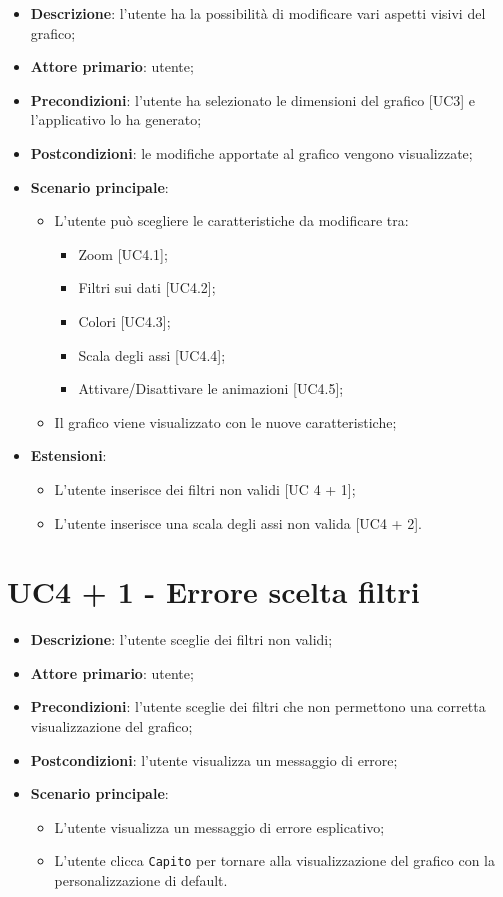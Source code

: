 \begin{itemize}
  \item \textbf{Descrizione}: l'utente ha la possibilità di modificare vari aspetti visivi del grafico;
  \item \textbf{Attore primario}: utente;
  \item \textbf{Precondizioni}: l'utente ha selezionato le dimensioni del grafico [UC3] e l'applicativo lo ha generato;
  \item \textbf{Postcondizioni}: le modifiche apportate al grafico vengono visualizzate;
  \item \textbf{Scenario principale}:
  \begin{itemize}
    \item L'utente può scegliere le caratteristiche da modificare tra:
      \begin{itemize}
        \item Zoom [UC4.1];
        \item Filtri sui dati [UC4.2];
        \item Colori [UC4.3];
        \item Scala degli assi [UC4.4];
        \item Attivare/Disattivare le animazioni [UC4.5];
      \end{itemize}
    \item Il grafico viene visualizzato con le nuove caratteristiche;
  \end{itemize}
  \item \textbf{Estensioni}:
    \begin{itemize}
      \item L'utente inserisce dei filtri non validi [UC 4 + 1];
      \item L'utente inserisce una scala degli assi non valida [UC4 + 2].
    \end{itemize}
\end{itemize}

\section{UC4 + 1 - Errore scelta filtri}
\begin{itemize}
  \item \textbf{Descrizione}: l'utente sceglie dei filtri non validi;
  \item \textbf{Attore primario}: utente;
  \item \textbf{Precondizioni}: l'utente sceglie dei filtri che non permettono una corretta visualizzazione del grafico;
  \item \textbf{Postcondizioni}: l'utente visualizza un messaggio di errore;
  \item \textbf{Scenario principale}:
    \begin{itemize}
      \item L'utente visualizza un messaggio di errore esplicativo;
      \item L'utente clicca \texttt{Capito} per tornare alla visualizzazione del grafico con la personalizzazione di default.
    \end{itemize}
\end{itemize}

